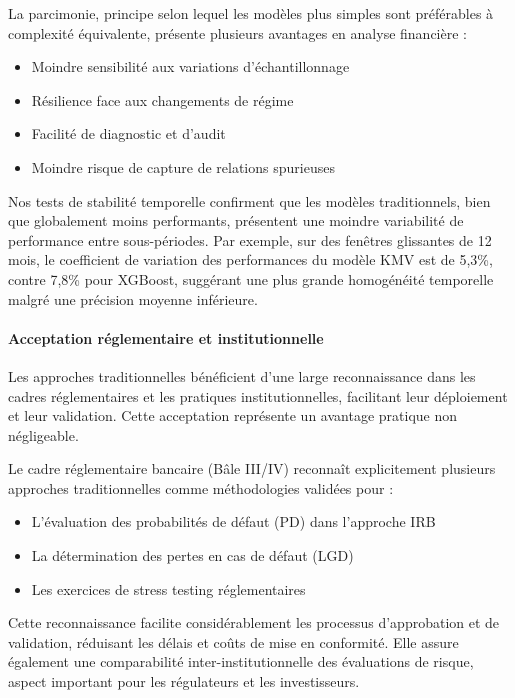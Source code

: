 La parcimonie, principe selon lequel les modèles plus simples sont préférables à complexité équivalente, présente plusieurs avantages en analyse financière :
\begin{itemize}
    \item Moindre sensibilité aux variations d'échantillonnage
    \item Résilience face aux changements de régime
    \item Facilité de diagnostic et d'audit
    \item Moindre risque de capture de relations spurieuses
\end{itemize}

Nos tests de stabilité temporelle confirment que les modèles traditionnels, bien que globalement moins performants, présentent une moindre variabilité de performance entre sous-périodes. Par exemple, sur des fenêtres glissantes de 12 mois, le coefficient de variation des performances du modèle KMV est de 5,3\%, contre 7,8\% pour XGBoost, suggérant une plus grande homogénéité temporelle malgré une précision moyenne inférieure.

\paragraph{Acceptation réglementaire et institutionnelle}

Les approches traditionnelles bénéficient d'une large reconnaissance dans les cadres réglementaires et les pratiques institutionnelles, facilitant leur déploiement et leur validation. Cette acceptation représente un avantage pratique non négligeable.

Le cadre réglementaire bancaire (Bâle III/IV) reconnaît explicitement plusieurs approches traditionnelles comme méthodologies validées pour :
\begin{itemize}
    \item L'évaluation des probabilités de défaut (PD) dans l'approche IRB
    \item La détermination des pertes en cas de défaut (LGD)
    \item Les exercices de stress testing réglementaires
\end{itemize}

Cette reconnaissance facilite considérablement les processus d'approbation et de validation, réduisant les délais et coûts de mise en conformité. Elle assure également une comparabilité inter-institutionnelle des évaluations de risque, aspect important pour les régulateurs et les investisseurs.

